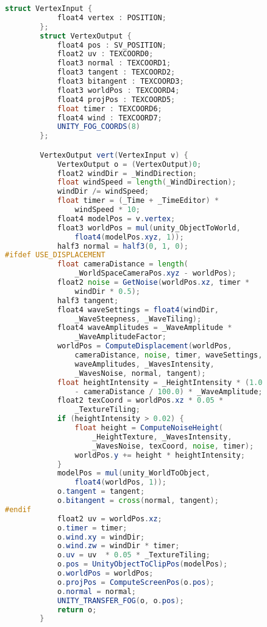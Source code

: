 \begin{lstlisting}[language=GLSL, caption={\label{cf:agua} \textit{Shader} de efeito de água na Unity}]
		struct VertexInput {
			float4 vertex : POSITION;
		};
		struct VertexOutput {
			float4 pos : SV_POSITION;
			float2 uv : TEXCOORD0;
			float3 normal : TEXCOORD1;  
			float3 tangent : TEXCOORD2;
			float3 bitangent : TEXCOORD3;
			float3 worldPos : TEXCOORD4;
			float4 projPos : TEXCOORD5;
			float timer : TEXCOORD6;
			float4 wind : TEXCOORD7; 
			UNITY_FOG_COORDS(8)
		};

		VertexOutput vert(VertexInput v) {
			VertexOutput o = (VertexOutput)0;
			float2 windDir = _WindDirection;
			float windSpeed = length(_WindDirection);
			windDir /= windSpeed;
			float timer = (_Time + _TimeEditor) * 
				windSpeed * 10;
			float4 modelPos = v.vertex;
			float3 worldPos = mul(unity_ObjectToWorld, 
				float4(modelPos.xyz, 1));
			half3 normal = half3(0, 1, 0);
#ifdef USE_DISPLACEMENT
			float cameraDistance = length(
				_WorldSpaceCameraPos.xyz - worldPos);
			float2 noise = GetNoise(worldPos.xz, timer * 
				windDir * 0.5);
			half3 tangent;
			float4 waveSettings = float4(windDir, 
				_WaveSteepness, _WaveTiling);
			float4 waveAmplitudes = _WaveAmplitude * 
				_WaveAmplitudeFactor;
			worldPos = ComputeDisplacement(worldPos, 
				cameraDistance, noise, timer, waveSettings, 
				waveAmplitudes, _WavesIntensity, 
				_WavesNoise, normal, tangent);
			float heightIntensity = _HeightIntensity * (1.0 
				- cameraDistance / 100.0) * _WaveAmplitude;
			float2 texCoord = worldPos.xz * 0.05 *
				_TextureTiling;
			if (heightIntensity > 0.02) {
				float height = ComputeNoiseHeight(
					_HeightTexture, _WavesIntensity, 
					_WavesNoise, texCoord, noise, timer);
				worldPos.y += height * heightIntensity;
			}
			modelPos = mul(unity_WorldToObject, 
				float4(worldPos, 1));
			o.tangent = tangent;
			o.bitangent = cross(normal, tangent);
#endif
			float2 uv = worldPos.xz;
			o.timer = timer;
			o.wind.xy = windDir;
			o.wind.zw = windDir * timer;
			o.uv = uv  * 0.05 * _TextureTiling;
			o.pos = UnityObjectToClipPos(modelPos);
			o.worldPos = worldPos;
			o.projPos = ComputeScreenPos(o.pos);
			o.normal = normal;
			UNITY_TRANSFER_FOG(o, o.pos);
			return o;
		}


\end{lstlisting}
